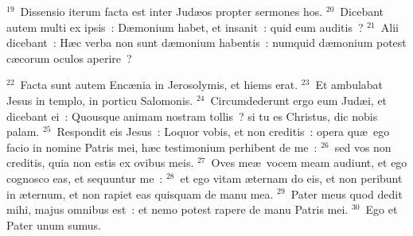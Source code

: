 ${}^{19}$~Dissensio iterum facta est inter Jud\ae os propter sermones hos.
${}^{20}$~Dicebant autem multi ex ipsis~: D\ae monium habet, et insanit~: quid eum auditis~?
${}^{21}$~Alii dicebant~: H\ae c verba non sunt d\ae monium habentis~: numquid d\ae monium potest c\ae corum oculos aperire~?


${}^{22}$~Facta sunt autem Enc\ae nia in Jerosolymis, et hiems erat.
${}^{23}$~Et ambulabat Jesus in templo, in porticu Salomonis.
${}^{24}$~Circumdederunt ergo eum Jud\ae i, et dicebant ei~: Quousque animam nostram tollis~? si tu es Christus, dic nobis palam.
${}^{25}$~Respondit eis Jesus~: Loquor vobis, et non creditis~: opera qu\ae\ ego facio in nomine Patris mei, h\ae c testimonium perhibent de me~:
${}^{26}$~sed vos non creditis, quia non estis ex ovibus meis.
${}^{27}$~Oves me\ae\ vocem meam audiunt, et ego cognosco eas, et sequuntur me~:
${}^{28}$~et ego vitam \ae ternam do eis, et non peribunt in \ae ternum, et non rapiet eas quisquam de manu mea.
${}^{29}$~Pater meus quod dedit mihi, majus omnibus est~: et nemo potest rapere de manu Patris mei.
${}^{30}$~Ego et Pater unum sumus.


